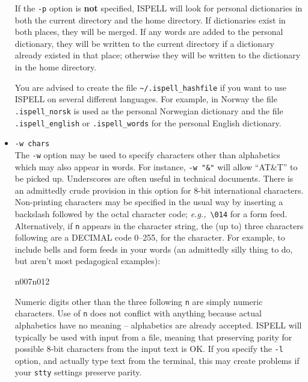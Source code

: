 \documentclass[noabs,nolof,twoside,11pt]{starlink}
\providecommand{\sunspec}[2]{#1}
\begin{document}
\begin{itemize}
If the \verb+-p+ option is \textbf{not} specified, ISPELL will look for personal
dictionaries in both the current directory and the home directory.
If dictionaries exist in both places, they will be merged.
If any words are added to the personal dictionary, they will be written to the
current directory if a dictionary already existed in that place; otherwise they
will be written to the dictionary in the home directory.

You are advised to create the file \verb+~/.ispell_hashfile+ if you want to use
ISPELL on several different languages.
For example, in Norway the file \verb+.ispell_norsk+ is used as the personal
Norwegian dictionary and the file \verb+.ispell_english+ or
\verb+.ispell_words+ for the personal English dictionary.

\item {\Large\tt -w chars}\\
The \verb+-w+ option may be used to specify characters other than alphabetics
which may also appear in words.
For instance, \verb+-w "&"+ will allow ``AT\&T'' to be picked up.
Underscores are often useful in technical documents.
There is an admittedly crude provision in this option for 8-bit international
characters.
Non-printing characters may be specified in the usual way by inserting a
backslash followed by the octal character code; {\it{e.g.,}}\ \verb+\014+ for a
form feed.
Alternatively, if \verb+n+ appears in the character string, the (up to) three
characters following are a DECIMAL code 0\sunspec{--}{-}255, for the character.
For example, to include bells and form feeds in your words (an admittedly silly
thing to do, but aren't most pedagogical examples):

\begin{terminalv}
n007n012
\end{terminalv}

Numeric digits other than the three following \verb+n+ are simply numeric
characters.  Use of \verb+n+ does not conflict with anything because actual
alphabetics have no meaning \sunspec{--}{-} alphabetics are already accepted.
ISPELL will typically be used with input from a file, meaning that preserving
parity for possible 8-bit characters from the input text is OK\@.
If you specify the \verb+-l+ option, and actually type text from the terminal,
this may create problems if your \verb+stty+ settings preserve parity.


\end{itemize}
\end{document}
